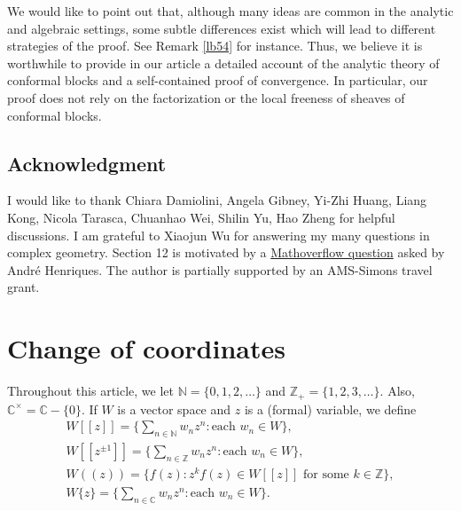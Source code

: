 \documentclass[12pt,a4paper,notitlepage]{article}
\theoremstyle{definition}
\theoremstyle{plain}
\newcommand{\mbb}{\mathbb}
\newcommand{\Cbb}{\mathbb C}
\newcommand{\Nbb}{\mathbb N}
\newcommand{\Zbb}{\mathbb Z}
\numberwithin{equation}{section}
\begin{document}
We would like to point out that, although many ideas are common in the  analytic and algebraic settings,  some subtle differences exist which will lead to different strategies of the proof. See Remark \ref{lb54} for instance. Thus, we believe it is worthwhile to provide in our article a detailed  account of the analytic theory of conformal blocks and a self-contained proof of convergence. In particular, our proof does not rely on the factorization or the local freeness of sheaves of conformal blocks.







\subsection*{Acknowledgment}

I would like to thank Chiara Damiolini, Angela Gibney, Yi-Zhi Huang, Liang Kong, Nicola Tarasca, Chuanhao Wei, Shilin Yu, Hao Zheng for helpful discussions. I am grateful to Xiaojun Wu for answering my many questions in complex geometry. Section 12 is motivated by a  \href{https://mathoverflow.net/questions/300460/linear-independence-of-genus-one-correlation-functions/321362#321362}{Mathoverflow question}  asked by Andr\'e Henriques. The author is partially supported by an AMS-Simons travel grant.












\section{Change of coordinates}\label{lb58}

Throughout this article, we let $\Nbb=\{0,1,2,\dots\}$ and $\Zbb_+=\{1,2,3,\dots\}$. Also, $\Cbb^\times=\Cbb-\{0\}$. If $W$ is a vector space and $z$ is a (formal) variable, we  define 
\begin{gather*}
W[[z]]=\bigg\{\sum_{n\in\mathbb N}w_nz^n:\text{each }w_n\in W\bigg\},\\
W[[z^{\pm 1}]]=\bigg\{\sum_{n\in\mathbb Z}w_nz^n:\text{each }w_n\in W\bigg\},\\
W((z))=\Big\{f(z):z^kf(z)\in W[[z]]\text{ for some }k\in\mbb Z \Big\},\\
W\{z\}=\Big\{\sum_{n\in\mbb C}w_nz^n :\text{each $w_n\in W$}\Big\}.
\end{gather*}
\end{document}
